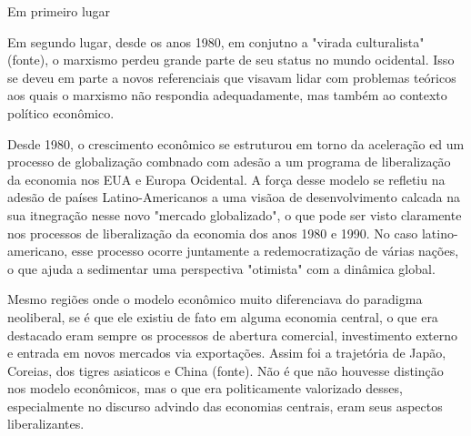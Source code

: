 Em primeiro lugar

Em segundo lugar, desde os anos 1980, em conjutno a "virada culturalista" (fonte), o marxismo perdeu grande parte de seu status no mundo ocidental. Isso se deveu em parte a novos referenciais que visavam lidar com problemas teóricos aos quais o marxismo não respondia adequadamente, mas também ao contexto político econômico. 

Desde 1980, o crescimento econômico se estruturou em torno  da aceleração ed um processo de globalização combnado com adesão a um programa de liberalização da economia nos EUA e Europa Ocidental. A força desse modelo se refletiu na adesão de países Latino-Americanos a uma visãoa de desenvolvimento calcada na sua itnegração nesse novo "mercado globalizado", o que pode ser visto claramente nos processos de liberalização da economia dos anos 1980 e 1990. No caso latino-americano, esse processo ocorre juntamente a redemocratização de várias nações, o que ajuda a sedimentar uma perspectiva "otimista" com a dinâmica global.

Mesmo regiões onde o modelo econômico muito diferenciava do paradigma neoliberal, se é que ele existiu de fato em alguma economia central, o que era destacado eram sempre os processos de abertura comercial, investimento externo e entrada em novos mercados via exportações. Assim foi a trajetória de Japão, Coreias, dos tigres asiaticos e China (fonte). Não é que não houvesse distinção nos modelo econômicos, mas o que era politicamente valorizado desses, especialmente no discurso advindo das economias centrais, eram seus aspectos liberalizantes.

